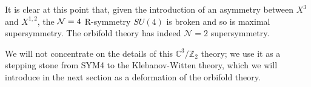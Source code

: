 It is clear at this point that, given the introduction of an asymmetry between $X^3$ and $X^{1,2}$, the $\mathcal{N} = 4$ R-symmetry $SU(4)$ is broken and so is maximal supersymmetry. The orbifold theory has indeed $\mathcal{N}=2$ supersymmetry\cite{Douglas}.

%
%
%
%
%
%
%
%
%

We will not concentrate on the details of this $\mathbb{C}^3/\mathbb{Z}_2$ theory; we use it as a stepping stone from SYM4 to the Klebanov-Witten theory, which we will introduce in the next section as a deformation of the orbifold theory.

